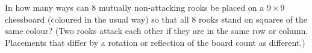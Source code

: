 In how many ways can $8$ mutually non-attacking rooks be placed on a $9\times9$ chessboard (coloured in the usual way) so that all $8$ rooks stand on squares of the same colour? (Two rooks attack each other if they are in the same row or column. Placements that differ by a rotation or reflection of the board count as different.)
